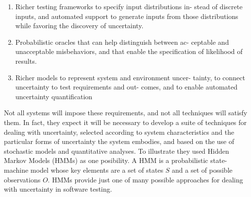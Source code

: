 \begin{enumerate}
  \item Richer testing frameworks to specify input distributions in- stead of discrete inputs, and automated support to generate inputs from those distributions while favoring the discovery of uncertainty.
  \item Probabilistic oracles that can help distinguish between ac- ceptable and unacceptable misbehaviors, and that enable the specification of likelihood of results.
  \item Richer models to represent system and environment uncer- tainty, to connect uncertainty to test requirements and out- comes, and to enable automated uncertainty quantification
\end{enumerate}
Not all systems will impose these requirements, and not all techniques will satisfy them. In fact, they expect it will be necessary to develop a suite of techniques for dealing with uncertainty, selected according to system characteristics and the particular forms of uncertainty the system embodies, and based on the use of stochastic models and quantitative analyses. To illustrate they used Hidden Markov Models (HMMs) as one posibility. A HMM is a probabilistic state-machine model whose key elements are a set of states $S$ and a set of possible observations $O$. HMMs provide just one of many possible approaches for dealing with uncertainty in software testing.

